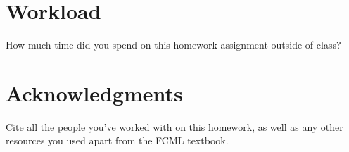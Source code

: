 \documentclass[11pt]{article}
\begin{document}
\newpage

\section{Workload}

How much time did you spend on this homework assignment outside of class?

\section*{Acknowledgments}

Cite all the people you've worked with on this homework, as well as any other
resources you used apart from the FCML textbook.
\end{document}
